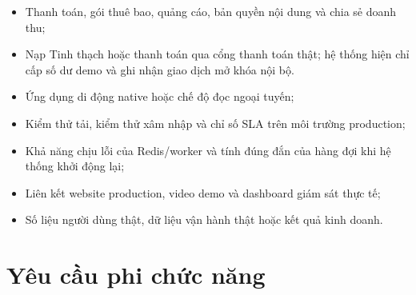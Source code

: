 \begin{itemize}[leftmargin=4.5em, label=--, labelsep=0.6em]
  \item Thanh toán, gói thuê bao, quảng cáo, bản quyền nội dung và chia sẻ doanh thu;
  \item Nạp Tinh thạch hoặc thanh toán qua cổng thanh toán thật; hệ thống hiện chỉ cấp số dư demo và ghi nhận giao dịch mở khóa nội bộ.
  \item Ứng dụng di động native hoặc chế độ đọc ngoại tuyến;
  \item Kiểm thử tải, kiểm thử xâm nhập và chỉ số SLA trên môi trường production;
  \item Khả năng chịu lỗi của Redis/worker và tính đúng đắn của hàng đợi khi hệ thống khởi động lại;
  \item Liên kết website production, video demo và dashboard giám sát thực tế;
  \item Số liệu người dùng thật, dữ liệu vận hành thật hoặc kết quả kinh doanh.
\end{itemize}



\section{Yêu cầu phi chức năng}

